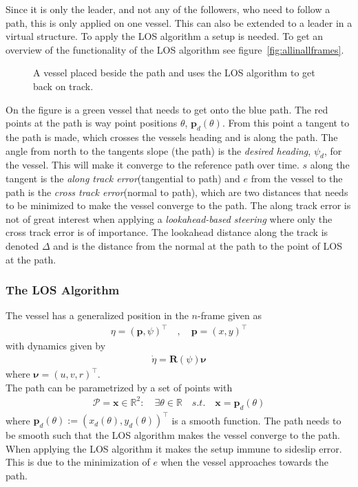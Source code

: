 Since it is only the leader, and not any of the followers, who need to follow a path, this is only applied on one vessel. This can also be extended to a leader in a virtual structure. To apply the \ac{LOS} algorithm a setup is needed. To get an overview of the functionality of the \ac{LOS} algorithm see figure~\vref{fig:allinallframes}.
\begin{figure}[htbp]
	\centering
	
	\caption{A vessel placed beside the path and uses the \ac{LOS} algorithm to get back on track.}
	\label{fig:allinallframes}
\end{figure}
On the figure is a green vessel that needs to get onto the blue path. The red points at the path is way point positions $\theta$, $\textbf{p}_d(\theta)$. From this point a tangent to the path is made, which crosses the vessels heading and is along the path. The angle from north to the tangents slope (the path) is the \textit{desired heading}, $\psi_d$, for the vessel. This will make it converge to the reference path over time. $s$ along the tangent is the \textit{along track error}(tangential to path) and $e$ from the vessel to the path is the \textit{cross track error}(normal to path), which are two distances that needs to be minimized to make the vessel converge to the path. The along track error is not of great interest when applying a \textit{lookahead-based steering} where only the cross track error is of importance. The lookahead distance along the track is denoted $\Delta$ and is the distance from the normal at the path to the point of \ac{LOS} at the path.

\subsubsection{The \ac{LOS} Algorithm}
The vessel has a generalized position in the ${n}$-frame given as
\begin{align}
\eta = (\textbf{p},\psi)^\top\quad , \quad \textbf{p} = (x,y)^\top
\end{align}
with dynamics given by
\begin{align}
\dot{\eta} = \textbf{R}(\psi)\boldsymbol{\nu}
\end{align}
where $\boldsymbol{\nu} = (u,v,r)^\top$.\\
The path can be parametrized by a set of points with
\begin{align}
\mathcal{P} = {\textbf{x}}\in\mathds{R}^2 : \quad \exists \theta \in \mathds{R} \quad s.t. \quad \textbf{x} = \textbf{p}_d(\theta)
\end{align}
where $\textbf{p}_d(\theta) := (x_d(\theta),y_d(\theta))^\top$ is a smooth function. The path needs to be smooth such that the \ac{LOS} algorithm makes the vessel converge to the path. When applying the \ac{LOS} algorithm it makes the setup immune to sideslip error. This is due to the minimization of $e$ when the vessel approaches towards the path.

